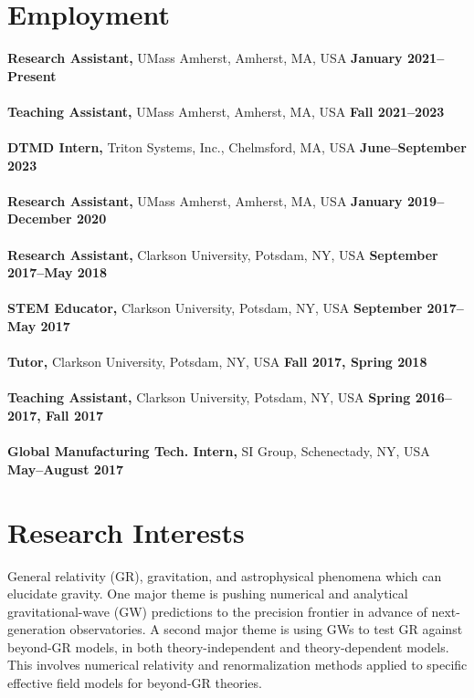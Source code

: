 \documentclass[margin,line]{res}
\begin{document}
\begin{resume}
	\section{\sc Employment}
	 {\bf Research Assistant,} UMass Amherst, Amherst, MA, USA
	\hfill {\bf January 2021--Present}\\
	\\
	{\bf Teaching Assistant,} UMass Amherst, Amherst, MA, USA
	\hfill {\bf Fall 2021--2023}\\
	\\
	{\bf DTMD Intern,} Triton Systems, Inc., Chelmsford, MA, USA
	\hfill {\bf June--September 2023}\\
	\\
	{\bf Research Assistant,} UMass Amherst, Amherst, MA, USA
	\hfill {\bf January 2019--December 2020}\\
	\\
	{\bf Research Assistant,} Clarkson University, Potsdam, NY, USA
	\hfill {\bf September 2017--May 2018}\\
	\\
	{\bf STEM Educator,} Clarkson University, Potsdam, NY, USA
	\hfill {\bf September 2017--May 2017}\\
	\\
	{\bf Tutor,} Clarkson University, Potsdam, NY, USA
	\hfill {\bf Fall 2017, Spring 2018}\\
	\\
	{\bf Teaching Assistant,} Clarkson University, Potsdam, NY, USA
	\hfill {\bf  Spring 2016--2017, Fall 2017}\\
	\\
	{\bf Global Manufacturing Tech. Intern,} SI Group, Schenectady, NY, USA
	\hfill {\bf  May--August 2017}\\

	\vspace{-1em}

	\section{\sc Research Interests}
	General relativity (GR), gravitation, and astrophysical phenomena which can
	elucidate gravity.
	One major theme is pushing numerical and analytical gravitational-wave
	(GW) predictions to the precision frontier in advance of
	next-generation observatories.
	A second major theme is using GWs to test GR against beyond-GR
	models, in both theory-independent and theory-dependent models.
	This involves numerical relativity and renormalization methods
	applied to specific effective field models for beyond-GR theories.


\end{resume}
\end{document}
